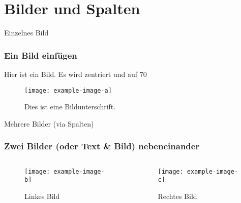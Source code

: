 \section{Bilder und Spalten}

\begin{frame}{Einzelnes Bild}
    \frametitle{Ein Bild einfügen}
    Hier ist ein Bild. Es wird zentriert und auf 70%
    
    \begin{figure}
        \centering
        \texttt{[image: example-image-a]}
        \caption{Dies ist eine Bildunterschrift.}
    \end{figure}
    
\end{frame}


\begin{frame}{Mehrere Bilder (via Spalten)}
    \frametitle{Zwei Bilder (oder Text \& Bild) nebeneinander}
    
    \begin{columns}[T]
    
        \begin{column}{0.48\textwidth}
            \begin{figure}
                \texttt{[image: example-image-b]}
                \caption{Linkes Bild}
            \end{figure}
        \end{column}
        
        \begin{column}{0.48\textwidth}
            \begin{figure}
                \texttt{[image: example-image-c]}
                \caption{Rechtes Bild}
            \end{figure}
        \end{column}
    \end{columns}
\end{frame}

